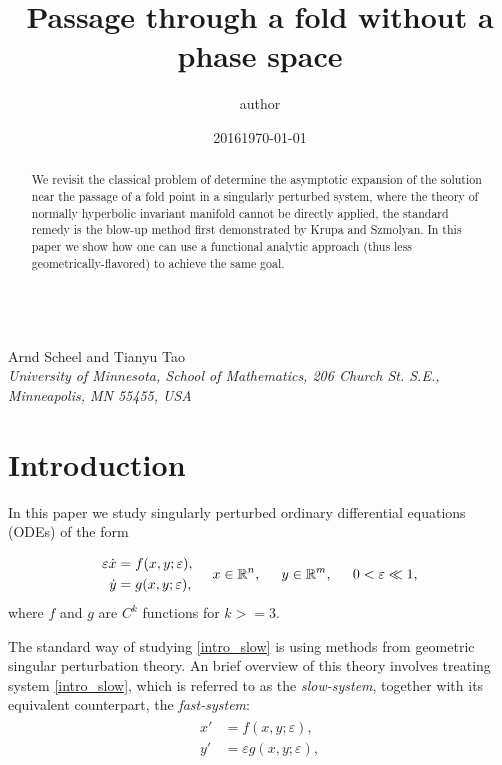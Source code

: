 \documentclass[letterpaper,11pt]{article}
\title{Passage through a fold without a phase space}
\author{author}
\date{2016}
\newcommand{\eps}{\varepsilon}
\numberwithin{equation}{section}
\theoremstyle{plain}
\begin{document}
\begin{center}

{\fontsize{17}{17}\selectfont{Alternatives to the blow-up method in singular perturbation problems}}\\[0.2in]
Arnd Scheel and Tianyu Tao\\
\textit{\footnotesize 
University of Minnesota, School of Mathematics,   206 Church St. S.E., Minneapolis, MN 55455, USA}
\date{\small \today} 
\vspace*{0.2in}
\end{center}

\begin{abstract}
\noindent We revisit the classical problem of determine the asymptotic expansion of the solution near the passage of a fold point in a singularly perturbed system, where the theory of normally hyperbolic invariant manifold cannot be directly applied, the standard remedy is the blow-up method first demonstrated by Krupa and Szmolyan. In this paper we show how one can use a functional analytic approach (thus less geometrically-flavored) to achieve the same goal.
\end{abstract}

\section{Introduction}
In this paper we study singularly perturbed ordinary differential equations (ODEs) of the form

\begin{align}\label{intro_slow}
\begin{split}
\eps \dot{x} &=  f(x,y;\eps),\\
\dot{y } &=   g(x,y;\eps),   
\end{split}\hspace{0.2in} x\in \mathbb{R}^n, \hspace{0.2in} y \in \mathbb{R}^m, \hspace{0.2in} 0<\eps \ll 1,
\end{align}
where $f$ and $g$ are $C^k$ functions for $k>=3$.

The standard way of studying \eqref{intro_slow} is using methods from geometric singular perturbation theory. An brief overview of this theory involves treating system \eqref{intro_slow}, which is referred to as the \textit{slow-system}, together with its  equivalent counterpart, the \textit{fast-system}:
\begin{align}\label{intro_fast}
\begin{split}
x' &=  f(x,y;\eps),\\
y' &=  \eps g(x,y;\eps),   
\end{split}
\end{align}
\end{document}
